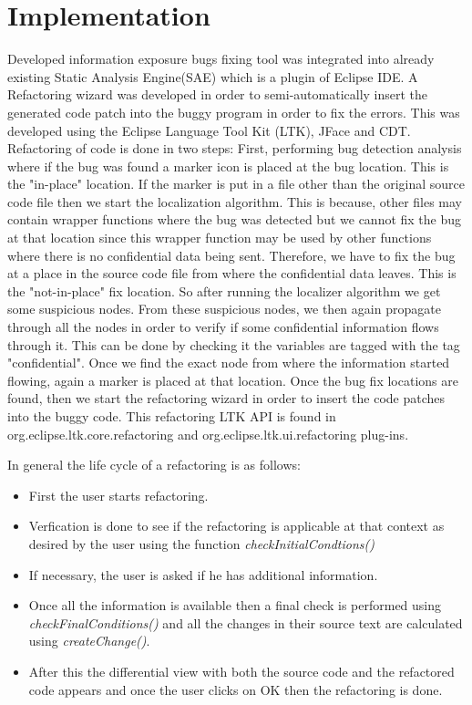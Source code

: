 \chapter{Implementation}
\label{chapter:impl}


Developed information exposure bugs fixing tool was integrated into already existing Static Analysis Engine(SAE) which
is a plugin of Eclipse IDE. A Refactoring wizard was developed in order to semi-automatically insert the generated code patch
into the buggy program in order to fix the errors. This was developed using the Eclipse Language Tool Kit (LTK), JFace and 
CDT. Refactoring of code is done in two steps: First, performing bug detection analysis where if the bug was found
a marker icon is placed at the bug location. This is the "in-place" location. If the marker is put in a file other than
the original source code file then we start the localization algorithm. This is because, other files may contain
wrapper functions where the bug was detected but we cannot fix the bug at that location since this
wrapper function may be used by other functions where there is no confidential data being sent. Therefore,
we have to fix the bug at 
a place in the source code file from where the confidential data leaves. This is the "not-in-place" fix location.
So after running the localizer algorithm we get some suspicious nodes. From these 
suspicious nodes, we then again propagate
through all the nodes in order to verify if some confidential 
information flows through it. This can be done
by checking it the variables are tagged with the tag "confidential". Once we find the exact node from where
 the information started flowing, again a marker is placed at that location. Once the bug fix locations are found, then 
 we start the refactoring wizard in order to insert the code patches into the buggy code.
This refactoring LTK API is found in org.eclipse.ltk.core.refactoring and org.eclipse.ltk.ui.refactoring 
plug-ins. 

In general the life cycle of a refactoring is as follows:
\begin{itemize}
 \item First the user starts refactoring.
 \item Verfication is done to see if the refactoring is applicable at that
 context as desired by the user using the function \emph{checkInitialCondtions()}
 \item If necessary, the user is asked if he has additional information.
 \item Once all the information is available then a final check is performed
 using \emph{checkFinalConditions()} and all the changes in their
 source text are calculated using \emph{createChange()}.
 \item After this the differential view with both the source code and
 the refactored code appears and once the user clicks on OK then the
 refactoring is done.
 \end{itemize}
 
